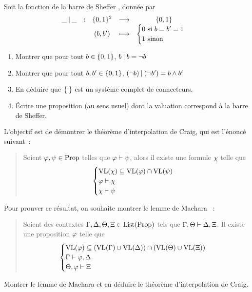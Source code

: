 \begin{exercise}
  Soit la fonction de la barre de Sheffer \cite{Sheffer1913}, donnée par
  \[\makeFun{\tok\Sheffer\tok}{\intB^2}{\intB}{(b,b')}
            {\begin{cases}
                0 \text{ si } b = b' = 1 \\
                1 \text{ sinon}
            \end{cases}}\]
  \begin{enumerate}[resume,label=(\roman*)]
  \item Montrer que pour tout $b \in \{0,1\}$,
    $b \mathbin{\vert} b = \lnot b$
  \item Montrer que pour tout $b,b' \in \{0,1\}$,
    $(\lnot b) \mathbin{\vert} (\lnot b') = b \land b'$
  \item En déduire que $\{\mathord{\mathbin{\vert}}\}$ est un système complet de
    connecteurs.
  \item \'Ecrire une proposition (au sens usuel) dont la
    valuation correspond à la barre de Sheffer.
  \end{enumerate}
\end{exercise}

\begin{exercise}
  L'objectif est de démontrer le théorème d'interpolation de Craig, qui est
  l'énoncé suivant~:
  \begin{quotation}
    \noindent
    Soient $\varphi,\psi\in\operatorname{Prop}$ telles que $\varphi\vdash\psi$, alors il
    existe une formule $\chi$ telle que
    \[\begin{cases}
    \operatorname{VL}(\chi) \subseteq \operatorname{VL}(\varphi)\cap\operatorname{VL}(\psi)\\
    \varphi\vdash\chi\\
    \chi\vdash\psi
    \end{cases}\]
  \end{quotation}

  Pour prouver ce résultat, on souhaite montrer le lemme de Maehara
  \cite{Maehara1954}~:
  \begin{quotation}
    \noindent
    Soient des contextes $\Gamma,\Delta,\Theta,\Xi \in \operatorname{List}(\operatorname{Prop})$ tels que
    $\Gamma,\Theta\vdash \Delta,\Xi$. Il existe une proposition $\varphi$ telle
    que
    \[\begin{cases}
    \operatorname{VL}(\varphi)\subseteq
    (\operatorname{VL}(\Gamma)\cup\operatorname{VL}(\Delta))
    \cap(\operatorname{VL}(\Theta)\cup\operatorname{VL}(\Xi))\\
    \Gamma\vdash \varphi,\Delta\\
    \Theta, \varphi\vdash\Xi
    \end{cases}\]
  \end{quotation}
  Montrer le lemme de Maehara et en déduire le théorème d'interpolation de
  Craig.
\end{exercise}

